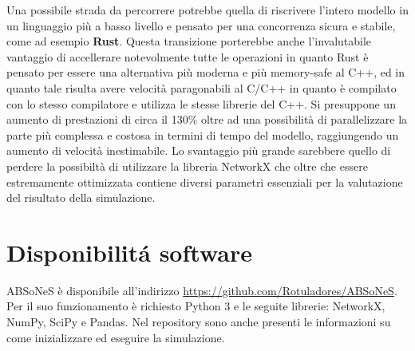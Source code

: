 \documentclass[a4paper,12pt]{article}
\begin{document}
\begin{description}
Una possibile strada da percorrere potrebbe quella di riscrivere l'intero modello in un linguaggio pi\`u a basso livello e pensato per una concorrenza sicura e stabile, come ad esempio \textbf{Rust}. Questa transizione porterebbe anche l'invalutabile vantaggio di accellerare notevolmente tutte le operazioni in quanto Rust \`e pensato per essere una alternativa pi\`u moderna e pi\`u memory-safe al C++, ed in quanto tale risulta avere velocit\`a paragonabili al C/C++ in quanto \`e compilato con lo stesso compilatore e utilizza le stesse librerie del C++. Si presuppone un aumento di prestazioni di circa il 130\% oltre ad una possibilit\`a di parallelizzare la parte pi\`u complessa e costosa in termini di tempo del modello, raggiungendo un aumento di velocit\`a inestimabile. 
Lo svantaggio pi\`u grande sarebbere quello di perdere la possibilt\`a di utilizzare la libreria NetworkX che oltre che essere estremamente ottimizzata contiene diversi parametri essenziali per la valutazione del risultato della simulazione.
\end{description}

\section{Disponibilit\'a software}
ABSoNeS \`e disponibile all'indirizzo \url{https://github.com/Rotuladores/ABSoNeS}. Per il suo funzionamento \`e richiesto Python 3 e le seguite librerie: NetworkX, NumPy, SciPy e Pandas.
Nel repository sono anche presenti le informazioni su come inizializzare ed eseguire la simulazione.
\end{document}
